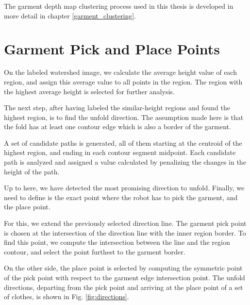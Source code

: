 The garment depth map clustering process used in this thesis is developed in more detail in chapter \ref{garment_clustering}.

\section{Garment Pick and Place Points}
On the labeled watershed image, we calculate the average height value of each region, and assign this average value to all points in the region. The region with the highest average height is selected for further analysis. 

The next step, after having labeled the similar-height regions and found the highest region, is to find the unfold direction. The assumption made here is that the fold has at least one contour edge which is also a border of the garment. 

A set of candidate paths is generated, all of them starting at the centroid of the highest region, and ending in each contour segment midpoint. Each candidate path is analyzed and assigned a value calculated by penalizing the changes in the height of the path.

Up to here, we have detected the most promising direction to unfold. Finally, we need to define is the exact point where the robot has to pick the garment, and the place point. 

For this, we extend the previously selected direction line. The garment pick point is chosen at the intersection of the direction line with the inner region border. To find this point, we compute the intersection between the line and the region contour, and select the point furthest to the garment border.

On the other side, the place point is selected by computing the symmetric point of the pick point with respect to the garment edge intersection point. The unfold directions, departing from the pick point and arriving at the place point of a set of clothes, is shown in Fig. \ref{fig:directions}.

